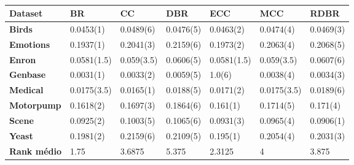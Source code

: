 \begin{table}[\tabmode]
\begin{tabular}{lllllll}
\hline
\textbf{Dataset}    & \textbf{BR} & \textbf{CC} & \textbf{DBR} & \textbf{ECC} & \textbf{MCC} & \textbf{RDBR} \\ \hline
\textbf{Birds}      & 0.0453(1)   & 0.0489(6)   & 0.0476(5)    & 0.0463(2)    & 0.0474(4)    & 0.0469(3)     \\
\textbf{Emotions}   & 0.1937(1)   & 0.2041(3)   & 0.2159(6)    & 0.1973(2)    & 0.2063(4)    & 0.2068(5)     \\
\textbf{Enron}      & 0.0581(1.5) & 0.059(3.5)  & 0.0606(5)    & 0.0581(1.5)  & 0.059(3.5)   & 0.0607(6)     \\
\textbf{Genbase}    & 0.0031(1)   & 0.0033(2)   & 0.0059(5)    & 1.0(6)       & 0.0038(4)    & 0.0034(3)     \\
\textbf{Medical}    & 0.0175(3.5) & 0.0165(1)   & 0.0188(5)    & 0.0171(2)    & 0.0175(3.5)  & 0.0189(6)     \\
\textbf{Motorpump}  & 0.1618(2)   & 0.1697(3)   & 0.1864(6)    & 0.161(1)     & 0.1714(5)    & 0.171(4)      \\
\textbf{Scene}      & 0.0925(2)   & 0.1003(5)   & 0.1065(6)    & 0.0931(3)    & 0.0965(4)    & 0.0906(1)     \\
\textbf{Yeast}      & 0.1981(2)   & 0.2159(6)   & 0.2109(5)    & 0.195(1)     & 0.2054(4)    & 0.2031(3)     \\ \hline
\textbf{Rank médio} & 1.75        & 3.6875      & 5.375        & 2.3125       & 4            & 3.875         \\ \hline
\end{tabular}
\caption{}
\label{tab:HLknn}
\end{table}